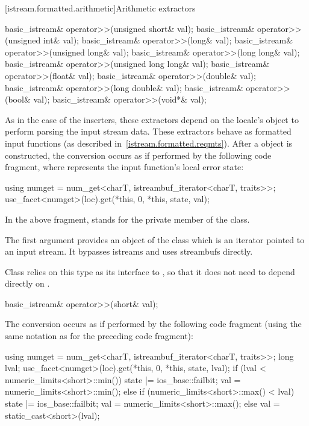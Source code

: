 [istream.formatted.arithmetic]{Arithmetic extractors}

%
\begin{itemdecl}
basic_istream& operator>>(unsigned short& val);
basic_istream& operator>>(unsigned int& val);
basic_istream& operator>>(long& val);
basic_istream& operator>>(unsigned long& val);
basic_istream& operator>>(long long& val);
basic_istream& operator>>(unsigned long long& val);
basic_istream& operator>>(float& val);
basic_istream& operator>>(double& val);
basic_istream& operator>>(long double& val);
basic_istream& operator>>(bool& val);
basic_istream& operator>>(void*& val);
\end{itemdecl}

\begin{itemdescr}
\pnum
As in the case of the inserters, these extractors depend on the
locale's
 object to perform parsing the input
stream data.
These extractors behave as formatted input functions (as described in~\ref{istream.formatted.reqmts}).  After a  object is constructed, the
conversion occurs as if performed by the following code fragment,
where  represents the input function's local error state:
\begin{codeblock}
using numget = num_get<charT, istreambuf_iterator<charT, traits>>;
use_facet<numget>(loc).get(*this, 0, *this, state, val);
\end{codeblock}
In the above fragment,
stands for the private member of the
class.
\begin{note}
The first argument provides an object of the
class which is an iterator pointed to an input stream.
It bypasses istreams and uses streambufs directly.
\end{note}
Class
relies on this
type as its interface to
,
so that it does not need to depend directly on
.
\end{itemdescr}

%
\begin{itemdecl}
basic_istream& operator>>(short& val);
\end{itemdecl}

\begin{itemdescr}
\pnum
The conversion occurs as if performed by the following code fragment
(using the same notation as for the preceding code fragment):
\begin{codeblock}
using numget = num_get<charT, istreambuf_iterator<charT, traits>>;
long lval;
use_facet<numget>(loc).get(*this, 0, *this, state, lval);
if (lval < numeric_limits<short>::min()) {
  state |= ios_base::failbit;
  val = numeric_limits<short>::min();
} else if (numeric_limits<short>::max() < lval) {
  state |= ios_base::failbit;
  val = numeric_limits<short>::max();
} else
  val = static_cast<short>(lval);
\end{codeblock}
\end{itemdescr}

